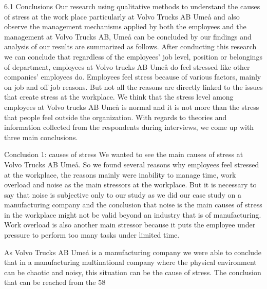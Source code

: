 6.1 Conclusions            
Our research using qualitative methods to understand the causes of stress at the work place 
particularly at Volvo Trucks AB Umeå and also observe the management mechanisms applied 
by both the employees and the management at Volvo Trucks AB, Umeå can be concluded by 
our findings and analysis of our results are summarized as follows. 
After conducting this research we can conclude that regardless of the employees’ job level, 
position or belongings of department, employees at Volvo trucks AB Umeå do feel stressed 
like other companies’ employees do. Employees feel stress because of various factors, mainly 
on job and off job reasons. But not all the reasons are directly linked to the issues that create 
stress at the workplace. We think that the stress level among employees at Volvo trucks AB 
Umeå is normal and it is not more than the stress that people feel outside the organization. 
With regards to theories and information collected from the respondents during interviews, 
we come up with three main conclusions.  
 
Conclusion 1: causes of stress 
We wanted to see the main causes of stress at Volvo Trucks AB Umeå. So we found several 
reasons why employees feel stressed at the workplace, the reasons mainly were inability to 
manage  time,  work  overload  and noise  as  the  main  stressors  at  the  workplace.  But  it  is 
necessary  to  say  that  noise  is  subjective  only  to  our  study  as  we  did  our  case  study  on  a 
manufacturing  company  and  the  conclusion  that  noise  is  the  main  causes  of  stress  in  the 
workplace might not be valid beyond an industry that is of manufacturing. Work overload is 
also another main stressor because it puts the employee under pressure to perform too many 
tasks under limited time.  
 
As Volvo Trucks AB Umeå is a manufacturing company we were able to conclude that in a 
manufacturing  multinational  company  where  the  physical  environment  can  be  chaotic  and 
noisy, this situation can be the cause of stress. The conclusion that can be reached from the 58 
 
